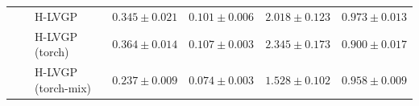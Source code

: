 \begin{table}[htbp]
\begin{tabular}{lllrrrr}
 &  & H-LVGP & $0.345 \pm 0.021$ & $0.101 \pm 0.006$ & $2.018 \pm 0.123$ & $0.973 \pm 0.013$ \\
 &  & H-LVGP (torch) & $0.364 \pm 0.014$ & $0.107 \pm 0.003$ & $2.345 \pm 0.173$ & $0.900 \pm 0.017$ \\
 &  & H-LVGP (torch-mix) & \colorbox{green!20}{\boldmath$0.237 \pm 0.009$} & \colorbox{green!20}{\boldmath$0.074 \pm 0.003$} & \colorbox{green!20}{\boldmath$1.528 \pm 0.102$} & \colorbox{green!20}{\boldmath$0.958 \pm 0.009$} \\
\bottomrule
\end{tabular}
\end{table}
